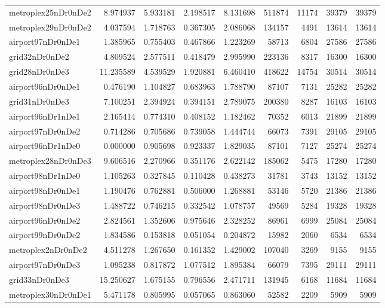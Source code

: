 \begin{longtable}{|l|r|r|r|r|r|r|r|r|}
metroplex25nDr0nDe2 & 8.974937 & 5.933181 & 2.198517 & 8.131698 & 511874 & 11174 & 39379 & 39379 \\
metroplex29nDr0nDe2 & 4.037594 & 1.718763 & 0.367305 & 2.086068 & 134157 & 4491 & 13614 & 13614 \\
airport97nDr0nDe1 & 1.385965 & 0.755403 & 0.467866 & 1.223269 & 58713 & 6804 & 27586 & 27586 \\
grid32nDr0nDe2 & 4.809524 & 2.577511 & 0.418479 & 2.995990 & 223136 & 8317 & 16300 & 16300 \\
grid28nDr0nDe3 & 11.235589 & 4.539529 & 1.920881 & 6.460410 & 418622 & 14754 & 30514 & 30514 \\
airport96nDr0nDe1 & 0.476190 & 1.104827 & 0.683963 & 1.788790 & 87107 & 7131 & 25282 & 25282 \\
grid31nDr0nDe3 & 7.100251 & 2.394924 & 0.394151 & 2.789075 & 200380 & 8287 & 16103 & 16103 \\
airport96nDr1nDe1 & 2.165414 & 0.774310 & 0.408152 & 1.182462 & 70352 & 6013 & 21899 & 21899 \\
airport97nDr0nDe2 & 0.714286 & 0.705686 & 0.739058 & 1.444744 & 66073 & 7391 & 29105 & 29105 \\
airport96nDr1nDe0 & 0.000000 & 0.905698 & 0.923337 & 1.829035 & 87101 & 7127 & 25274 & 25274 \\
metroplex28nDr0nDe3 & 9.606516 & 2.270966 & 0.351176 & 2.622142 & 185062 & 5475 & 17280 & 17280 \\
airport98nDr1nDe0 & 1.105263 & 0.327845 & 0.110428 & 0.438273 & 31781 & 3743 & 13152 & 13152 \\
airport98nDr0nDe1 & 1.190476 & 0.762881 & 0.506000 & 1.268881 & 53146 & 5720 & 21386 & 21386 \\
airport98nDr0nDe3 & 1.488722 & 0.746215 & 0.332542 & 1.078757 & 49569 & 5284 & 19328 & 19328 \\
airport96nDr0nDe2 & 2.824561 & 1.352606 & 0.975646 & 2.328252 & 86961 & 6999 & 25084 & 25084 \\
airport99nDr0nDe2 & 1.834586 & 0.153818 & 0.051054 & 0.204872 & 15982 & 2060 & 6534 & 6534 \\
metroplex2nDr0nDe2 & 4.511278 & 1.267650 & 0.161352 & 1.429002 & 107040 & 3269 & 9155 & 9155 \\
airport97nDr0nDe3 & 1.095238 & 0.817872 & 1.077512 & 1.895384 & 66079 & 7395 & 29111 & 29111 \\
grid33nDr0nDe3 & 15.250627 & 1.675155 & 0.796556 & 2.471711 & 131945 & 6168 & 11684 & 11684 \\
metroplex30nDr0nDe1 & 5.471178 & 0.805995 & 0.057065 & 0.863060 & 52582 & 2209 & 5909 & 5909 \\

\end{longtable}
